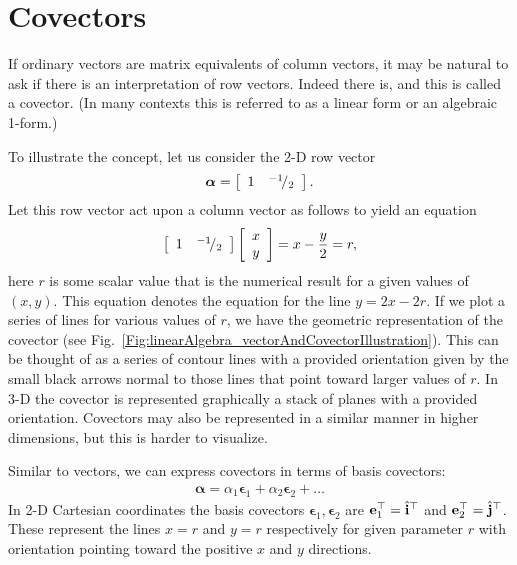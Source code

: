 \section{Covectors}

If ordinary vectors are matrix equivalents of column vectors, it may be natural to ask if there is an interpretation of row vectors. Indeed there is, and this is called a covector. (In many contexts this is referred to as a linear form or an algebraic 1-form.)

To illustrate the concept, let us consider the 2-D row vector
\begin{align}
  \boldsymbol\alpha = \left[ \begin{array}{c c} 1 & {}^{-1}\!/_{2} \\ \end{array} \right] . \nonumber
\end{align}
Let this row vector act upon a column vector as follows to yield an equation
\begin{align}
  \left[ \begin{array}{c c} 1 & {}^{-1}\!/_{2} \\ \end{array} \right] 
  \left[ \begin{array}{c} x \\ y \\ \end{array} \right] = x - \frac{y}{2} = r, \nonumber
\end{align}
here $r$ is some scalar value that is the numerical result for a given values of $(x,y)$. This equation denotes the equation for the line $y = 2x - 2r$. If we plot a series of lines for various values of $r$, we have the geometric representation of the covector (see Fig.~\ref{Fig:linearAlgebra_vectorAndCovectorIllustration}). This can be thought of as a series of contour lines with a provided orientation given by the small black arrows normal to those lines that point toward larger values of $r$. In 3-D the covector is represented graphically a stack of planes with a provided orientation. Covectors may also be represented in a similar manner in higher dimensions, but this is harder to visualize.

Similar to vectors, we can express covectors in terms of basis covectors:
\begin{align}
  \boldsymbol\alpha = \alpha_1 \boldsymbol\epsilon_1 + \alpha_2 \boldsymbol\epsilon_2 + \ldots
\end{align}
In 2-D Cartesian coordinates the basis covectors $\boldsymbol\epsilon_1, \boldsymbol\epsilon_2$ are $\mathbf{e}_1^\top = \hat{\mathbf{i}}^\top$ and $\mathbf{e}_2^\top = \hat{\mathbf{j}}^\top$. These represent the lines $x = r$ and $y = r$ respectively for given parameter $r$ with orientation pointing toward the positive $x$ and $y$ directions.

